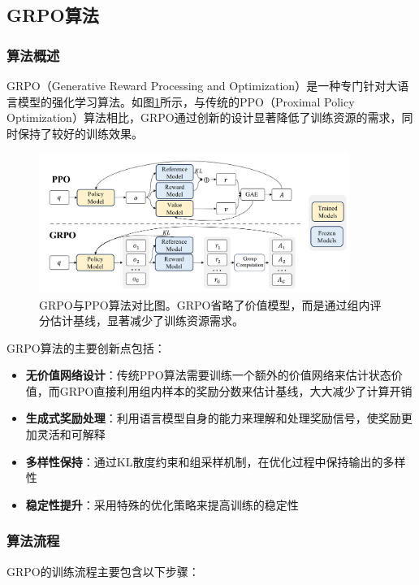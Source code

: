 \documentclass[a4paper, 12pt]{article}
\begin{document}
\subsection{GRPO算法}
\subsubsection{算法概述}
GRPO（Generative Reward Processing and Optimization）\cite{grpo2024}是一种专门针对大语言模型的强化学习算法。如图\ref{fig:grpo_framework}所示，与传统的PPO（Proximal Policy Optimization）算法相比，GRPO通过创新的设计显著降低了训练资源的需求，同时保持了较好的训练效果。

\begin{figure}[htbp]
    \centering
    \includegraphics[width=0.9\textwidth]{Images/GRPO.png}
    \caption{GRPO与PPO算法对比图。GRPO省略了价值模型，而是通过组内评分估计基线，显著减少了训练资源需求。}
    \label{fig:grpo_framework}
\end{figure}

GRPO算法的主要创新点包括：
\begin{itemize}
    \item \textbf{无价值网络设计}：传统PPO算法需要训练一个额外的价值网络来估计状态价值，而GRPO直接利用组内样本的奖励分数来估计基线，大大减少了计算开销
    \item \textbf{生成式奖励处理}：利用语言模型自身的能力来理解和处理奖励信号，使奖励更加灵活和可解释
    \item \textbf{多样性保持}：通过KL散度约束和组采样机制，在优化过程中保持输出的多样性
    \item \textbf{稳定性提升}：采用特殊的优化策略来提高训练的稳定性
\end{itemize}

\subsubsection{算法流程}
GRPO的训练流程主要包含以下步骤：
\end{document}
